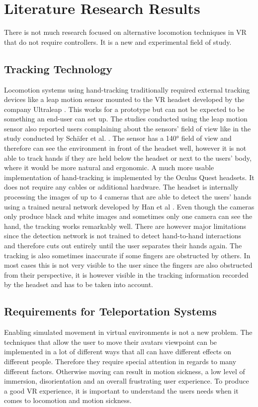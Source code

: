 \chapter{Literature Research Results}

There is not much research focused on alternative locomotion techniques in VR that do not require controllers. It is a new and experimental field of study.

\section{Tracking Technology}
Locomotion systems using hand-tracking traditionally required external tracking devices like a leap motion sensor mounted to the VR headset developed by the company Ultraleap \cite{Ultraleap}.
This works for a prototype but can not be expected to be something an end-user can set up. The studies conducted using the leap motion sensor also reported users complaining about the sensors' field of view like in the study conducted by Schäfer et al. \cite{Schafer2021}.
The sensor has a 140° field of view and therefore can see the environment in front of the headset well, however it is not able to track hands if they are held below the headset or next to the users' body, where it would be more natural and ergonomic. A much more usable implementation of hand-tracking is implemented by the Oculus Quest headsets. It does not require any cables or additional hardware. The headset is internally processing the images of up to 4 cameras that are able to detect the users' hands using a trained neural network developed by Han et al \cite{Han}.
Even though the cameras only produce black and white images and sometimes only one camera can see the hand, the tracking works remarkably well. There are however major limitations since the detection network is not trained to detect hand-to-hand interactions and therefore cuts out entirely until the user separates their hands again. The tracking is also sometimes inaccurate if some fingers are obstructed by others. In most cases this is not very visible to the user since the fingers are also obstructed from their perspective, it is however visible in the tracking information recorded by the headset and has to be taken into account. 

\section{Requirements for Teleportation Systems}
Enabling simulated movement in virtual environments is not a new problem. The techniques that allow the user to move their avatars viewpoint can be implemented in a lot of different ways that all can have different effects on different people. Therefore they require special attention in regards to many different factors. Otherwise moving can result in motion sickness, a low level of immersion, disorientation and an overall frustrating user experience. To produce a good VR experience, it is important to understand the users needs when it comes to locomotion and motion sickness. 

